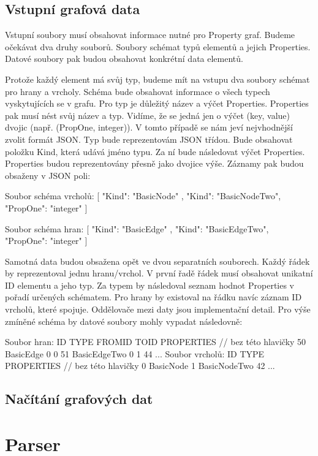 \subsection{Vstupní grafová data}

Vstupní soubory musí obsahovat informace nutné pro Property graf.
Budeme očekávat dva druhy souborů.
Soubory schémat typů elementů a jejich Properties.
Datové soubory pak budou obsahovat konkrétní data elementů.

Protože každý element má svůj typ, budeme mít na vstupu dva soubory schémat pro hrany a vrcholy.
Schéma bude obsahovat informace o všech typech vyskytujících se v grafu.
Pro typ je důležitý název a výčet Properties.
Properties pak musí nést svůj název a typ.
Vidíme, že se jedná jen o výčet (key, value) dvojic (např. (PropOne, integer)).
V tomto případě se nám jeví nejvhodnější zvolit formát JSON.
Typ bude reprezentovám JSON třídou. 
Bude obsahovat položku Kind, která udává jméno typu.
Za ní bude následovat výčet Properties.
Properties budou reprezentovány přesně jako dvojice výše.
Záznamy pak budou obsaženy v JSON poli:
\begin{code}
Soubor schéma vrcholů:
[    { "Kind": "BasicNode" }, 
{ "Kind": "BasicNodeTwo", "PropOne": "integer" } ]

Soubor schéma hran:
[    { "Kind": "BasicEdge" }, 
{ "Kind": "BasicEdgeTwo", "PropOne": "integer" } ]
\end{code}

Samotná data budou obsažena opět ve dvou separatních souborech.
Každý řádek by reprezentoval jednu hranu/vrchol.
V první řadě řádek musí obsahovat unikatní ID elementu a jeho typ. 
Za typem by následoval seznam hodnot Properties v pořadí určených schématem.
Pro hrany by existoval na řádku navíc záznam ID vrcholů, které spojuje.
Oddělovače mezi daty jsou implementační detail.
Pro výše zmíněné schéma by datové soubory mohly vypadat následovně:
\begin{code}
Soubor hran:
ID TYPE FROMID TOID PROPERTIES // bez této hlavičky
50 BasicEdge 0 0 
51 BasicEdgeTwo 0 1 44
...
Soubor vrcholů:
ID TYPE PROPERTIES // bez této hlavičky
0 BasicNode
1 BasicNodeTwo 42
...
\end{code}

\subsection{Načítání grafových dat}




\section{Parser}

